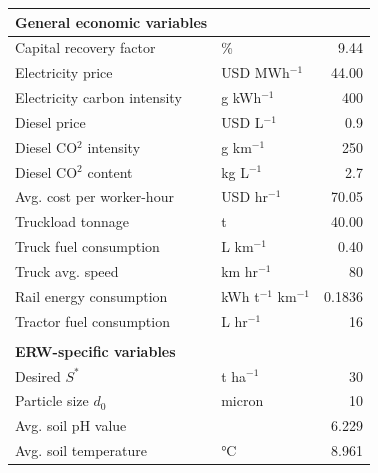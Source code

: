 \begin{table}
\vspace*{-\baselineskip}
\small
\begin{tabular}{llr}
\hline
\textbf{General economic variables} &           &                      \\ \hline
Capital recovery factor             & \%        & 9.44                 \\
Electricity price                   & USD MWh$^{-1}$  & 44.00                \\
Electricity carbon intensity        & g kWh$^{-1}$   & 400                  \\
Diesel price                        & USD L$^{-1}$    & 0.9                  \\
Diesel CO$^2$ intensity             & g km$^{-1}$    & 250                  \\
Diesel CO$^2$ content             & kg L$^{-1}$    & 2.7                  \\
Avg. cost per worker-hour           & USD hr$^{-1}$ & 70.05                \\
Truckload tonnage                   & t         & 40.00                \\
Truck fuel consumption              & L km$^{-1}$    & 0.40                 \\
Truck avg. speed                    & km hr$^{-1}$   & 80                   \\
Rail energy consumption             & kWh t$^{-1}$ km$^{-1}$ & 0.1836               \\
Tractor fuel consumption            & L hr$^{-1}$     & 16                   \\ \hline
                                    &           & \multicolumn{1}{l}{} \\ \hline
\textbf{ERW-specific variables}     &           & \multicolumn{1}{l}{} \\ \hline
Desired \(S^*\)                     & t ha$^{-1}$    & 30                   \\
Particle size \(d_0\)               & micron    & 10                   \\
Avg. soil pH value                  &           & 6.229                \\
Avg. soil temperature               & °C        & 8.961                \\ \hline
\end{tabular}
\label{us-case-table}
\vspace*{-\baselineskip}
\end{table}

